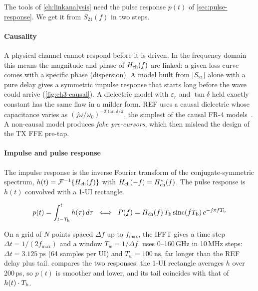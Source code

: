 The tools of \cref{ch:linkanalysis} need the pulse response $p(t)$ of \cref{sec:pulse-response}. We get it from $S_{21}(f)$ in two steps.

\paragraph{Causality}
A physical channel cannot respond before it is driven. In the frequency domain this means the magnitude and phase of $H_\mathrm{ch}(f)$ are linked: a given loss curve comes with a specific phase (dispersion). A model built from $\lvert S_{21}\rvert$ alone with a pure delay gives a symmetric impulse response that starts long before the wave could arrive (\cref{fig:ch3-causal}). A dielectric model with $\varepsilon_r$ and $\tan\delta$ held exactly constant has the same flaw in a milder form. REF uses a causal dielectric whose capacitance varies as $(j\omega/\omega_0)^{-2\tan\delta/\pi}$, the simplest of the causal FR-4 models~\citep{p2:djordjevic2001}. A non-causal model produces \emph{fake pre-cursors}, which then mislead the design of the TX FFE pre-tap.

\paragraph{Impulse and pulse response}
The impulse response is the inverse Fourier transform of the conjugate-symmetric spectrum, $h(t) = \mathcal F^{-1}\{H_\mathrm{ch}(f)\}$ with $H_\mathrm{ch}(-f) = H_\mathrm{ch}^*(f)$. The pulse response is $h(t)$ convolved with a 1-UI rectangle.

\begin{keyeq}
\begin{equation}
  p(t) = \int_{t-T_\mathrm{b}}^{t} h(\tau)\,d\tau
  \;\;\Longleftrightarrow\;\;
  P(f) = H_\mathrm{ch}(f)\,T_\mathrm{b}\,\mathrm{sinc}(fT_\mathrm{b})\,e^{-j\pi fT_\mathrm{b}}
  \label{eq:ch3-pulse}
\end{equation}
\end{keyeq}
On a grid of $N$ points spaced $\Delta f$ up to $f_\mathrm{max}$, the IFFT gives a time step $\Delta t = 1/(2f_\mathrm{max})$ and a window $T_w = 1/\Delta f$.  uses 0--160\,GHz in 10\,MHz steps: $\Delta t = \qty{3.125}{\pico\second}$ (64 samples per UI) and $T_w = \qty{100}{\nano\second}$, far longer than the REF delay plus tail.  compares the two responses: the 1-UI rectangle averages $h$ over 200\,ps, so $p(t)$ is smoother and lower, and its tail coincides with that of $h(t)\cdot T_\mathrm{b}$.

